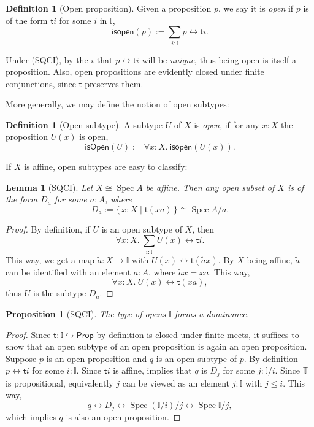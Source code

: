 \documentclass[12pt]{amsart}
\newtheorem{lemma}[theorem]{Lemma}
\newtheorem{proposition}[theorem]{Proposition}
\theoremstyle{definition}
\newtheorem{definition}[theorem]{Definition}
\newcommand{\mbb}[1]{\mathbb{#1}}
\newcommand{\T}{\mbb T}
\newcommand{\I}{\mbb I}
\newcommand{\ms}[1]{\mathsf{#1}}
\newcommand{\qsi}[1]{\tilde{#1}}
\newcommand{\scomp}[2]{\{\,#1\mid#2\,\}}
\newcommand{\hook}{\hookrightarrow}
\newcommand{\fa}[2]{\forall #1\!\colon\!\!#2.\ }
\newcommand{\eq}{\leftrightarrow}
\newcommand{\pp}{\ms{Prop}}
\newcommand{\spec}{\operatorname{Spec}}
\begin{document}
\begin{definition}[Open proposition]
  Given a proposition $p$, we say it is \emph{open} if $p$ is of the form $\ms ti$ for some $i$ in $\I$,
  \[ \ms{isopen}(p) := \sum_{i:\I}p \eq \ms ti. \]
\end{definition}

Under (SQCI), by  the $i$ that $p \eq \ms ti$ will be \emph{unique}, thus being open is itself a proposition. Also, open propositions are evidently closed under finite conjunctions, since $\ms t$ preserves them. 

More generally, we may define the notion of open subtypes:

\begin{definition}[Open subtype]
  A subtype $U$ of $X$ is \emph{open}, if for any $x:X$ the proposition $U(x)$ is open,
  \[ \ms{isOpen}(U) := \fa xX \ms{isopen}(U(x)). \]
\end{definition}

If $X$ is affine, open subtypes are easy to classify:

\begin{lemma}[SQCI]\label{lem:openofaffinegivesalgebra}
  Let $X \cong \spec A$ be affine. Then any open subset of $X$ is of the form $D_a$ for some $a:A$, where
  \[ D_a := \scomp{x : X}{\ms t(xa)} \cong \spec A/a. \]
\end{lemma}
\begin{proof}
  By definition, if $U$ is an open subtype of $X$, then 
  \[ \fa xX\sum_{i:\I}U(x) \eq \ms ti. \] 
  This way, we get a map $\qsi a : X \to \I$ with $U(x) \eq \ms t(\qsi ax)$. By $X$ being affine, $\qsi a$ can be identified with an element $a:A$, where $\qsi ax = xa$. This way,
  \[ \fa xX U(x) \eq \ms t(xa), \]
  thus $U$ is the subtype $D_a$.
\end{proof}

\begin{proposition}[SQCI]\label{prop:Idominance}
  The type of opens $\I$ forms a dominance.
\end{proposition}
\begin{proof}
  Since $\ms t : \I \hook \pp$ by definition is closed under finite meets, it suffices to show that an open subtype of an open proposition is again an open proposition. Suppose $p$ is an open proposition and $q$ is an open subtype of $p$. By definition $p \eq \ms ti$ for some $i:\I$. Since $\ms ti$ is affine,  implies that $q$ is $D_j$ for some $j : \I/i$. Since $\T$ is propositional, equivalently $j$ can be viewed as an element $j : \I$ with $j \le i$. This way, 
  \[ q \eq D_j \eq \spec(\I/i)/j \eq \spec\I/j, \]
  which implies $q$ is also an open proposition.
\end{proof}
\end{document}
